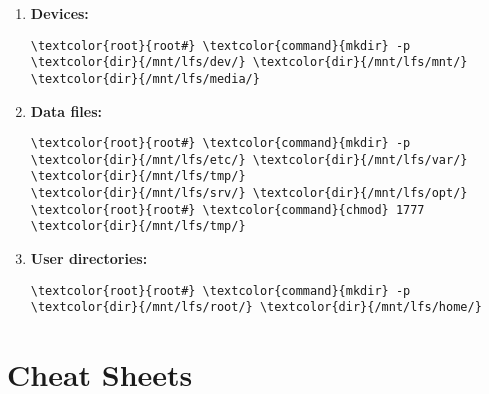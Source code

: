 \documentclass[10pt, a4paper, onecolumn, oneside, titlepage, openany]{book}
\begin{document}
\begin{enumerate}
    \item \textbf{Devices:}
\begin{Verbatim}[commandchars=\\\{\}]
\textcolor{root}{root#} \textcolor{command}{mkdir} -p \textcolor{dir}{/mnt/lfs/dev/} \textcolor{dir}{/mnt/lfs/mnt/} \textcolor{dir}{/mnt/lfs/media/}
\end{Verbatim}
    \item \textbf{Data files:}
\begin{Verbatim}[commandchars=\\\{\}]
\textcolor{root}{root#} \textcolor{command}{mkdir} -p \textcolor{dir}{/mnt/lfs/etc/} \textcolor{dir}{/mnt/lfs/var/} \textcolor{dir}{/mnt/lfs/tmp/}
\textcolor{dir}{/mnt/lfs/srv/} \textcolor{dir}{/mnt/lfs/opt/}
\textcolor{root}{root#} \textcolor{command}{chmod} 1777 \textcolor{dir}{/mnt/lfs/tmp/}
\end{Verbatim}
    \item \textbf{User directories:}
\begin{Verbatim}[commandchars=\\\{\}]
\textcolor{root}{root#} \textcolor{command}{mkdir} -p \textcolor{dir}{/mnt/lfs/root/} \textcolor{dir}{/mnt/lfs/home/}
\end{Verbatim}
\end{enumerate}



\chapter{Cheat Sheets}
\end{document}
